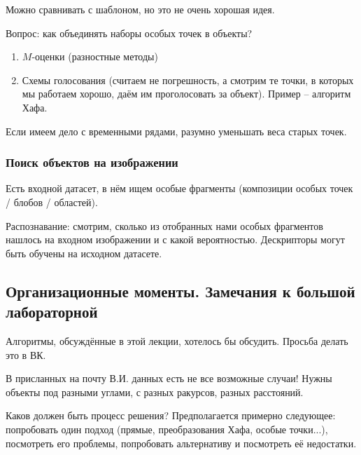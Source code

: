 \documentclass[main.tex]{subfiles}
\begin{document}
Можно сравнивать с шаблоном, но это не очень хорошая идея.

Вопрос: как объединять наборы особых точек в объекты?

\begin{enumerate}[noitemsep]
	\item $ M $-оценки (разностные методы)
	\item Схемы голосования (считаем не погрешность, а смотрим те точки, в которых мы работаем хорошо, даём им проголосовать за объект).
	Пример -- алгоритм Хафа.
\end{enumerate}

Если имеем дело с временными рядами, разумно уменьшать веса старых точек.

\subsubsection{Поиск объектов на изображении}

Есть входной датасет, в нём ищем особые фрагменты (композиции особых точек / блобов / областей).

Распознавание: смотрим, сколько из отобранных нами особых фрагментов нашлось на входном изображении и с какой вероятностью.
Дескрипторы могут быть обучены на исходном датасете.

\subsection{Организационные моменты. Замечания к большой лабораторной}

Алгоритмы, обсуждённые в этой лекции, хотелось бы обсудить.
Просьба делать это в ВК.

В присланных на почту В.И. данных есть не все возможные случаи!
Нужны объекты под разными углами, с разных ракурсов, разных расстояний.

Каков должен быть процесс решения?
Предполагается примерно следующее: попробовать один подход (прямые, преобразования Хафа, особые точки...), посмотреть его проблемы, попробовать альтернативу и посмотреть её недостатки.
\end{document}
